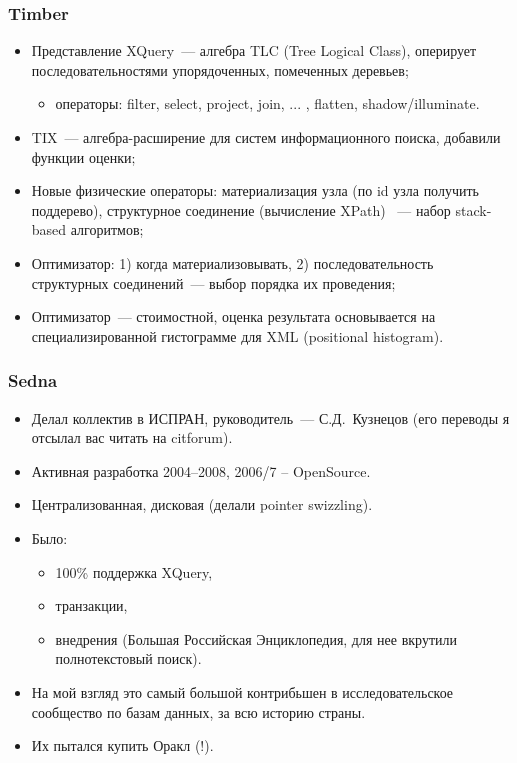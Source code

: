 \documentclass{beamer}
\begin{document}
\begin{frame}
\frametitle{Timber}

\begin{itemize}
  \setlength\itemsep{1em}
  \item Представление XQuery~--- алгебра TLC (Tree Logical Class), оперирует последовательностями упорядоченных, помеченных деревьев;

  \begin{itemize}
	\item операторы: filter, select, project, join, ... , flatten, shadow/illuminate.  	
\end{itemize}

  
  
  \item TIX~--- алгебра-расширение для систем информационного поиска, добавили функции оценки;
  \item Новые физические операторы: материализация узла (по id узла получить поддерево), структурное соединение (вычисление XPath) ~--- набор stack-based алгоритмов;
  \item Оптимизатор: 1) когда материализовывать, 2) последовательность структурных соединений~--- выбор порядка их проведения;
  \item Оптимизатор~--- стоимостной, оценка результата основывается на специализированной гистограмме для XML (positional histogram).
\end{itemize}
\end{frame}

\begin{frame}
	\frametitle{Sedna}
	
	\begin{itemize}
		\setlength\itemsep{1em}
		\item Делал коллектив в ИСПРАН, руководитель~--- С.Д.~Кузнецов (его переводы я отсылал вас читать на citforum).
		\item Активная разработка 2004--2008, 2006/7 -- OpenSource.
		\item Централизованная, дисковая (делали pointer swizzling).
		\item Было:
		\begin{itemize}
			\item 100\% поддержка XQuery,
			\item транзакции,
			\item внедрения (Большая Российская Энциклопедия, для нее вкрутили полнотекстовый поиск).
		\end{itemize}
		\item На мой взгляд это самый большой контрибьшен в исследовательское сообщество по базам данных, за всю историю страны.
		\item Их пытался купить Оракл (!).
	\end{itemize}
\end{frame}
\end{document}
